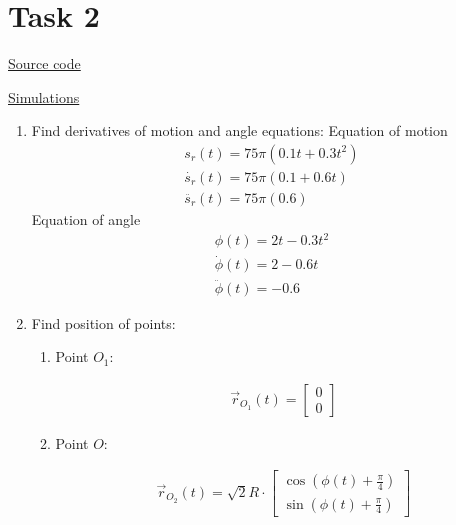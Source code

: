 \section{Task 2}


\href{https://github.com/lvjonok/f22-theoretical-mechanics/blob/master/homework3/task2.ipynb}{Source code}

\href{https://lvjonok.github.io/f22-theoretical-mechanics/2022/09/18/homework3.html}{Simulations}

\begin{enumerate}
    \item Find derivatives of motion and angle equations:
          Equation of motion
          \begin{align}
              s_r(t) = 75 \pi (0.1 t + 0.3 t^2)   \\
              \dot{s_r}(t) = 75 \pi (0.1 + 0.6 t) \\
              \ddot{s_r}(t) = 75 \pi (0.6)
          \end{align}
          Equation of angle
          \begin{align}
              \phi(t) = 2t - 0.3t^2    \\
              \dot{\phi}(t) = 2 - 0.6t \\
              \ddot{\phi}(t) = -0.6
          \end{align}

    \item Find position of points:
          \begin{enumerate}
              \item Point $O_1$:
                    \begin{answer}
                        \begin{align}
                            \vec{r}_{O_1}(t) = \begin{bmatrix}
                                0 \\
                                0
                            \end{bmatrix}
                        \end{align}
                    \end{answer}
              \item Point $O$:
                    \begin{answer}
                        \begin{align}
                            \vec{r}_{O_2}(t) = \sqrt{2} R \cdot \begin{bmatrix}
                                \cos(\phi(t) + \frac{\pi}{4}) \\
                                \sin(\phi(t) + \frac{\pi}{4})
                            \end{bmatrix}
                        \end{align}


\end{answer}
\end{enumerate}
\end{enumerate}
